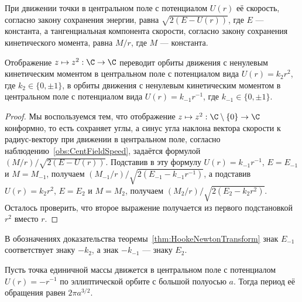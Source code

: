 \documentclass[
	extrafontsizes,
	11pt,
	hyphens,
]{memoir}
\begin{document}
\begin{observation}
При движении точки в центральном поле с потенциалом \(U(r)\) её скорость, согласно закону сохранения энергии, равна \(\sqrt{2(E - U(r))}\), где \(E\) --- константа,%
\label{obs:CentFieldSpeed}
а тангенциальная компонента скорости, согласно закону сохранения кинетического момента, равна \(M/r\), где \(M\) --- константа.
\end{observation}


\begin{theorem}
Отображение \(z \mapsto z^2 : \C \to \C\) переводит%
\label{thm:HookeNewtonTransform}
орбиты движения
с ненулевым кинетическим моментом
в центральном поле с потенциалом вида
\(U(r) = k_2 r^2\), где \(k_2 \in \{0, \pm 1\}\),
в орбиты движения
с ненулевым кинетическим моментом
в центральном поле с потенциалом вида
\(U(r) = k_{-1} r^{-1}\), где \(k_{-1} \in \{0, \pm 1\}\).
\end{theorem}

\begin{proof}%
Мы воспользуемся тем, что отображение \(z \mapsto z^2 : \C \setminus \{0\} \to \C\) конформно, то есть сохраняет углы,
а синус угла наклона вектора скорости к радиус-вектору при движении в центральном поле,
согласно наблюдению~\ref{obs:CentFieldSpeed},
задаётся формулой
\((M/r) / \sqrt{2(E - U(r))}\).
Подставив в эту формулу \(U(r) = k_{-1} r^{-1}\), \(E = E_{-1}\) и \(M = M_{-1}\), получаем \((M_{-1}/r) / \sqrt{2(E_{-1} - k_{-1} r^{-1})}\), а подставив \(U(r) = k_2 r^2\), \(E = E_2\) и \(M = M_2\), получаем \((M_2 / r) / \sqrt{2(E_2 - k_2 r^2)}\).
Осталось проверить, что второе выражение получается из первого подстановкой \(r^2\) вместо \(r\).
\end{proof}

\begin{remark}
В обозначениях доказательства теоремы~\ref{thm:HookeNewtonTransform} знак \(E_{-1}\) соответствует знаку \(- k_2\), а знак \(- k_{-1}\) --- знаку \(E_2\).
\end{remark}

\begin{theorem}
Пусть точка единичной массы движется в центральном поле с потенциалом \(U(r) = - r^{-1}\) по эллиптической орбите с большой полуосью \(a\).
Тогда период её обращения равен \(2 \pi a^{3/2}\).
\end{theorem}
\end{document}
